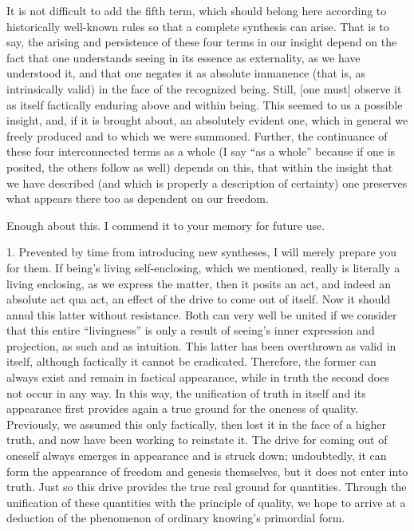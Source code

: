 It is not difficult to add the fifth term,
which should belong here
according to historically well-known rules
so that a complete synthesis can arise.
That is to say, the arising and persistence
of these four terms in our insight depend
on the fact that one understands
seeing in its essence as externality,
as we have understood it,
and that one negates it as absolute immanence
(that is, as intrinsically valid)
in the face of the recognized being.
Still, [one must] observe it as itself
factically enduring above and within being.
This seemed to us a possible insight,
and, if it is brought about,
an absolutely evident one,
which in general we freely produced
and to which we were summoned.
Further, the continuance of these
four interconnected terms as a whole
(I say “as a whole” because if one is posited,
the others follow as well)
depends on this,
that within the insight that we have described
(and which is properly a description of certainty)
one preserves what appears there too as dependent on our freedom.

Enough about this. I commend it to your memory for future use.

1. Prevented by time from introducing new syntheses,
I will merely prepare you for them.
If being's living self-enclosing, which we mentioned,
really is literally a living enclosing,
as we express the matter,
then it posits an act, and indeed an absolute act qua act,
an effect of the drive to come out of itself.
Now it should annul this latter without resistance.
Both can very well be united if we consider that
this entire “livingness” is only a result
of seeing's inner expression and projection,
as such and as intuition.
This latter has been overthrown as valid in itself,
although factically it cannot be eradicated.
Therefore, the former can always exist
and remain in factical appearance,
while in truth the second does not occur in any way.
In this way, the unification of truth in itself
and its appearance first provides again
a true ground for the oneness of quality.
Previously, we assumed this only factically,
then lost it in the face of a higher truth,
and now have been working to reinstate it.
The drive for coming out of oneself
always emerges in appearance
and is struck down;
undoubtedly, it can form the appearance
of freedom and genesis themselves,
but it does not enter into truth.
Just so this drive provides
the true real ground for quantities.
Through the unification of these quantities
with the principle of quality,
we hope to arrive at a deduction of
the phenomenon of ordinary knowing's
primordial form.

